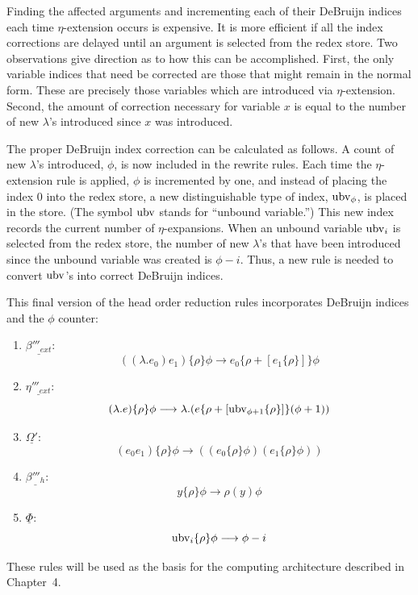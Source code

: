 Finding the affected arguments and incrementing each of their DeBruijn indices
each time \(\eta\)-extension occurs is expensive. It is more efficient if all
the index corrections are delayed until an argument is selected from the redex
store. Two observations give direction as to how this can be accomplished.
First, the only variable indices that need be corrected are those that might
remain in the normal form. These are precisely those variables which are
introduced via \(\eta\)-extension. Second, the amount of correction necessary
for variable \(x\) is equal to the number of new \(\lambda\)'s introduced since
\(x\) was introduced.

The proper DeBruijn index correction can be calculated as follows. A count of
new \(\lambda\)'s introduced, \(\phi\), is now included in the rewrite rules.
Each time the \(\eta\)-extension rule is applied, \(\phi\) is incremented by
one, and instead of placing the index 0 into the redex store, a new
distinguishable type of index, \(\operatorname{ubv}_\phi\), is placed in the store. (The
symbol \(\operatorname{ubv}\) stands for ``unbound variable.'') This new index records the
current number of \(\eta\)-expansions. When an unbound variable \(\operatorname{ubv}_i\) is
selected from the redex store, the number of new \(\lambda\)'s that have been
introduced since the unbound variable was created is \(\phi-i\). Thus, a new
rule is needed to convert \(\operatorname{ubv}\)'s into correct DeBruijn indices.

This final version of the head order reduction rules incorporates DeBruijn
indices and the \(\phi\) counter:

\begin{enumerate}
\item \(\underline{\beta'''_{ext}}\):
\[
((\lambda.e_0)e_1)\{\rho\}\phi
\longrightarrow e_0\{\rho+[e_1\{\rho\}]\}\phi
\]
\item \(\underline{\eta'''_{ext}}\):
\[
(\lambda.e)\{\rho\}\phi
\longrightarrow
\lambda.(e\{\rho+[\operatorname{ubv}_{\phi+1}\{\rho\}]\}(\phi+1))
\]
\item \(\underline{\Omega'}\):
\[
(e_0e_1)\{\rho\}\phi
\longrightarrow ((e_0\{\rho\}\phi)(e_1\{\rho\}\phi))
\]
\item \(\underline{\beta'''_h}\):
\[
y\{\rho\}\phi\longrightarrow \rho(y)\phi
\]
\item \(\underline{\Phi}\):
\[
\operatorname{ubv}_i\{\rho\}\phi\longrightarrow \phi-i
\]
\end{enumerate}

These rules will be used as the basis for the computing architecture described
in Chapter~4.


